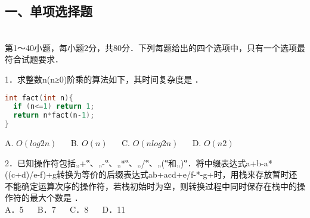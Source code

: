 
\subsection{一、单项选择题} \\
第1～40小题，每小题2分，共80分．下列每题给出的四个选项中，只有一个选项最符合试题要求．

1．求整数n(n≥0)阶乘的算法如下，其时间复杂度是 ． \\
\begin{lstlisting}[language=cpp]
int fact(int n){
  if (n<=1) return 1;
  return n*fact(n-1);
}
\end{lstlisting}
A. $O(log2n)$ $\quad$ B. $O(n)$ $\quad$ C. $O(nlog2n)$ $\quad$ D. $O(n2)$

2．已知操作符包括„+‟、„-‟、„*‟、„/‟、„(‟和„)‟．将中缀表达式a+b-a*((c+d)/e-f)+g转换为等价的后缀表达式ab+acd+e/f-*-g+时，用栈来存放暂时还不能确定运算次序的操作符，若栈初始时为空，则转换过程中同时保存在栈中的操作符的最大个数是 ． \\
A．5 $\quad$ B．7 $\quad$ C．8 $\quad$ D．11



